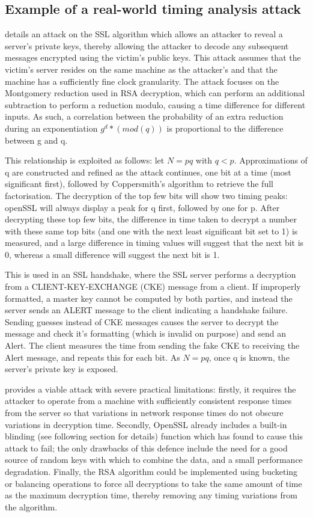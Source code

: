 \documentclass[british,10pt,a4paper]{article}
\begin{document}
\subsection{Example of a real-world timing analysis attack}
\citet{Brumley2005-ez} details an attack on the SSL algorithm which allows an attacker to reveal a server's private keys, thereby allowing the attacker to decode any subsequent messages encrypted using the victim's public keys. This attack assumes that the victim's server resides on the same machine as the attacker's and that the machine has a sufficiently fine clock granularity. The attack focuses on the Montgomery reduction used in RSA decryption, which can perform an additional subtraction to perform a reduction modulo, causing a time difference for different inputs. As such, a correlation between the probability of an extra reduction during an exponentiation \(g^d * (mod (q))\) is proportional to the difference between g and q.

This relationship is exploited as follows: let $N = pq$ with $q<p$. Approximations of q are constructed and refined as the attack continues, one bit at a time (most significant first), followed by Coppersmith's algorithm to retrieve the full factorisation. The decryption of the top few bits will show two timing peaks: openSSL will always display a peak for q first, followed by one for p. After decrypting these top few bits, the difference in time taken to decrypt a number with these same top bits (and one with the next least significant bit set to 1) is measured, and a large difference in timing values will suggest that the next bit is 0, whereas a small difference will suggest the next bit is 1.

This is used in an SSL handshake, where the SSL server performs a decryption from a CLIENT-KEY-EXCHANGE (CKE) message from a client. If improperly formatted, a master key cannot be computed by both parties, and instead the server sends an ALERT message to the client indicating a handshake failure. Sending guesses instead of CKE messages causes the server to decrypt the message and check it's formatting (which is invalid on purpose) and send an Alert. The client measures the time from sending the fake CKE to receiving the Alert message, and repeats this for each bit. As $N=pq$, once q is known, the server's private key is exposed.

\citeauthor{Brumley2005-ez} provides a viable attack with severe practical limitations: firstly, it requires the attacker to operate from a machine with sufficiently consistent response times from the server so that variations in network response times do not obscure variations in decryption time. Secondly, OpenSSL already includes a built-in blinding (see following section for details) function which \citeauthor{Brumley2005-ez} has found to cause this attack to fail; the only drawbacks of this defence include the need for a good source of random keys with which to combine the data, and a small performance degradation. Finally, the RSA algorithm could be implemented using bucketing or balancing operations to force all decryptions to take the same amount of time as the maximum decryption time, thereby removing any timing variations from the algorithm.
\end{document}
